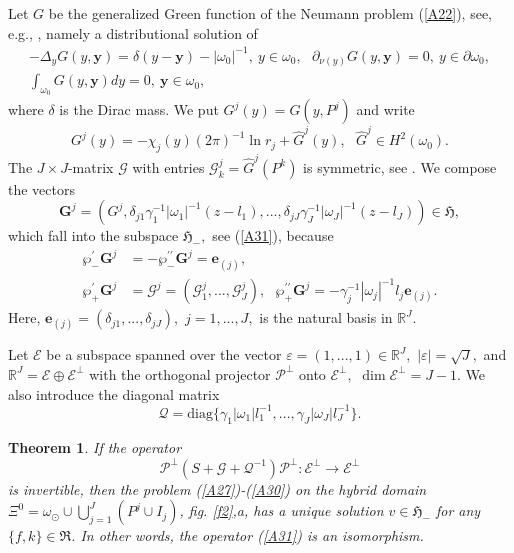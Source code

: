 \documentclass[11pt]{article}%
\newtheorem{theorem}{Theorem}
\numberwithin{equation}{section}
\begin{document}
Let $G$ be the generalized Green function of the Neumann problem (\ref{A22}),
see, e.g., \cite{Smir}, namely a distributional solution of%
\begin{gather}
-\Delta_{y}G(y,\mathbf{y})=\delta(y-\mathbf{y})-|\omega_{0}|^{-1},\ y\in
\omega_{0},\ \ \ \partial_{\nu(y)}G(y,\mathbf{y})=0,\ y\in\partial\omega
_{0},\label{A34}\\
\int_{\omega_{0}}G(y,\mathbf{y})dy=0,\ \mathbf{y}\in\omega_{0},\nonumber
\end{gather}
where $\delta$ is the Dirac mass. We put $G^{j}(y)=G(y,P^{j})$ and write%
\begin{equation}
G^{j}(y)=-\chi_{j}(y)(2\pi)^{-1}\ln r_{j}+\widehat{G}^{j}(y),\ \ \ \widehat
{G}^{j}\in H^{2}(\omega_{0}). \label{A35}%
\end{equation}
The $J\times J$-matrix $\mathcal{G}$ with entries $\mathcal{G}_{k}%
^{j}=\widehat{G}^{j}(P^{k})$ is symmetric, see \cite[ Sect. 2.2]{BuCaNa1}. We
compose the vectors%
\begin{equation}
\mathbf{G}^{j}=(G^{j},\delta_{j1}\gamma_{1}^{-1}|\omega_{1}|^{-1}%
(z-l_{1}),...,\delta_{jJ}\gamma_{J}^{-1}|\omega_{J}|^{-1}(z-l_{J}%
))\in\mathfrak{H}, \label{A36}%
\end{equation}
which fall into the subspace $\mathfrak{H}_{-},$ see (\ref{A31}), because%
\begin{align}
\wp_{-}^{\prime}\mathbf{G}^{j}  &  =-\wp_{-}^{\prime\prime}\mathbf{G}%
^{j}=\mathbf{e}_{(j)},\ \label{A37}\\
\wp_{+}^{\prime}\mathbf{G}^{j}  &  =\mathcal{G}^{j}=(\mathcal{G}_{1}%
^{j},...,\mathcal{G}_{J}^{j}),\ \ \ \wp_{+}^{\prime\prime}\mathbf{G}%
^{j}=-\gamma_{j}^{-1}|\omega_{j}|^{-1}l_{j}\mathbf{e}_{(j)}.\nonumber
\end{align}
Here, $\mathbf{e}_{(j)}=(\delta_{j1},...,\delta_{jJ}),$ $j=1,...,J,$ is the
natural basis in $\mathbb{R}^{J}$.

Let $\mathcal{E}$ be a subspace spanned over the vector $\varepsilon
=(1,...,1)\in\mathbb{R}^{J},$ $|\varepsilon|=\sqrt{J},$ and $\mathbb{R}%
^{J}=\mathcal{E\oplus E}^{\bot}$ with the orthogonal projector $\mathcal{P}%
^{\bot}$ onto $\mathcal{E}^{\bot},$ $\dim\mathcal{E}^{\bot}=J-1$. We also
introduce the diagonal matrix%
\begin{equation}
\mathcal{Q}=\mathrm{diag}\{\gamma_{1}|\omega_{1}|l_{1}^{-1},...,\gamma
_{J}|\omega_{J}|l_{J}^{-1}\}. \label{A38}%
\end{equation}


\begin{theorem}
\label{th6A}If the operator
\begin{equation}
\mathcal{P}^{\bot}(S+\mathcal{G}+\mathcal{Q}^{-1})\mathcal{P}^{\bot
}:\mathcal{E}^{\bot}\rightarrow\mathcal{E}^{\bot} \label{AAA}%
\end{equation}
is invertible, then the problem (\ref{A27})-(\ref{A30}) on the hybrid domain
$\Xi^{0}=\omega_{\odot}\cup%
{\textstyle\bigcup\nolimits_{j=1}^{J}}
(P^{j}\cup I_{j})$, fig. \ref{f2},a, has a unique solution $v\in
\mathfrak{H}_{-}$ for any $\{f,k\}\in\mathfrak{R}$. In other words, the
operator (\ref{A31}) is an isomorphism.
\end{theorem}
\end{document}
